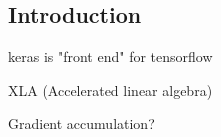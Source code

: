 
\subsection{Introduction}

keras is "front end" for tensorflow

XLA (Accelerated linear algebra)

Gradient accumulation?
